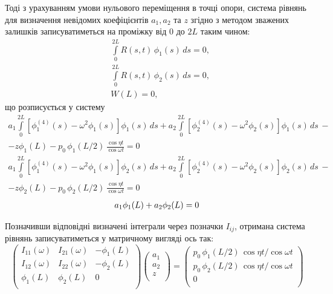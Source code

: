 Тоді з урахуванням умови нульового переміщення в точці опори, система рівнянь для визначення невідомих коефіцієнтів $a_1,a_2$ та $z$ згідно з методом зважених залишків записуватиметься на проміжку від $0$ до $2L$ таким чином:
\begin{align}
    & \int\limits_{0}^{2L} R(s,t)\, \phi_1(s)\, ds = 0, \\
    & \int\limits_{0}^{2L} R(s,t)\, \phi_2(s)\, ds = 0, \\
    & W(L) = 0, 
\end{align}
що розписується у систему 
\begin{multline}
    a_1\int\limits_{0}^{2L} \left[ \phi_1^{(4)}(s) - \omega^2 \phi_1(s) \right] \phi_1(s)\, ds + a_2\int\limits_{0}^{2L} \left[ \phi_2^{(4)}(s) - \omega^2 \phi_2(s) \right] \phi_1(s)\, ds\, - \\ 
    - z\phi_1(L) - p_0\,\phi_1(L/2)\,\frac{\cos{\eta t}}{\cos{\omega t}} = 0
\end{multline}
\begin{multline}
    a_1\int\limits_{0}^{2L} \left[ \phi_1^{(4)}(s) - \omega^2 \phi_1(s) \right] \phi_2(s)\, ds + a_2\int\limits_{0}^{2L} \left[ \phi_2^{(4)}(s) - \omega^2 \phi_2(s) \right] \phi_2(s)\, ds\, - \\
    - z\phi_2(L) - p_0\,\phi_2(L/2)\,\frac{\cos{\eta t}}{\cos{\omega t}} = 0
\end{multline}
\begin{multline}
    a_1\phi_1(L) + a_2\phi_2(L) = 0 \hfill
\end{multline}

Позначивши відповідні визначені інтеграли через позначки $I_{ij}$, отримана система рівнянь записуватиметься у матричному вигляді ось так:
\begin{equation}\label{eq: inhmo residuals matrix equation}
    \begin{pmatrix}
        I_{11}(\omega)    & I_{21}(\omega)    & -\phi_1(L) \\
        I_{12}(\omega)    & I_{22}(\omega)    & -\phi_2(L) \\
        \phi_1(L)         & \phi_2(L)         & 0          \\
    \end{pmatrix}
    \begin{pmatrix}
        a_1 \\
        a_2 \\
        z    \\
    \end{pmatrix} = 
    \begin{pmatrix}
        p_0\,\phi_1(L/2)\,\cos{\eta t} / \cos{\omega t} \\
        p_0\,\phi_2(L/2)\,\cos{\eta t} / \cos{\omega t} \\
        0                                                \\
    \end{pmatrix}
\end{equation}

